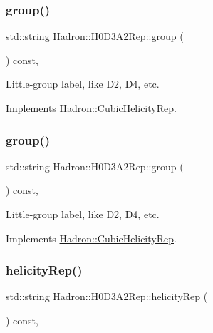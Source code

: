 \subsubsection{\texorpdfstring{group()}{group()}\hspace{0.1cm}{\footnotesize\ttfamily [2/3]}}
{\footnotesize\ttfamily std\+::string Hadron\+::\+H0\+D3\+A2\+Rep\+::group (\begin{DoxyParamCaption}{ }\end{DoxyParamCaption}) const\hspace{0.3cm}{\ttfamily [inline]}, {\ttfamily [virtual]}}

Little-\/group label, like D2, D4, etc. 

Implements \mbox{\hyperlink{structHadron_1_1CubicHelicityRep_a101a7d76cd8ccdad0f272db44b766113}{Hadron\+::\+Cubic\+Helicity\+Rep}}.

\mbox{\label{structHadron_1_1H0D3A2Rep_a456caa07466fd0a9ea5901d4aeb23e13}} 
\subsubsection{\texorpdfstring{group()}{group()}\hspace{0.1cm}{\footnotesize\ttfamily [3/3]}}
{\footnotesize\ttfamily std\+::string Hadron\+::\+H0\+D3\+A2\+Rep\+::group (\begin{DoxyParamCaption}{ }\end{DoxyParamCaption}) const\hspace{0.3cm}{\ttfamily [inline]}, {\ttfamily [virtual]}}

Little-\/group label, like D2, D4, etc. 

Implements \mbox{\hyperlink{structHadron_1_1CubicHelicityRep_a101a7d76cd8ccdad0f272db44b766113}{Hadron\+::\+Cubic\+Helicity\+Rep}}.

\mbox{\label{structHadron_1_1H0D3A2Rep_aed7cbc2156d185f430ce0ce0a4c29f54}} 
\subsubsection{\texorpdfstring{helicityRep()}{helicityRep()}\hspace{0.1cm}{\footnotesize\ttfamily [1/2]}}
{\footnotesize\ttfamily std\+::string Hadron\+::\+H0\+D3\+A2\+Rep\+::helicity\+Rep (\begin{DoxyParamCaption}{ }\end{DoxyParamCaption}) const\hspace{0.3cm}{\ttfamily [inline]}, {\ttfamily [virtual]}}

